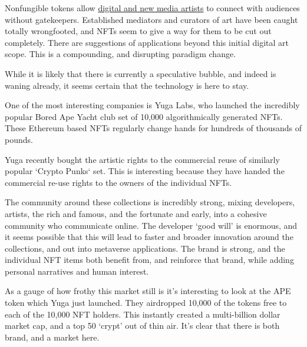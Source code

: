Nonfungible tokens allow \href{https://en.wikipedia.org/wiki/List_of_most_expensive_non-fungible_tokens}{digital and new media artists} to connect with audiences without gatekeepers. Established mediators and curators of art have been caught totally wrongfooted, and NFTs seem to give a way for them to be cut out completely. There are suggestions of applications beyond this initial digital art scope. This is a compounding, and disrupting paradigm change.\par
While it is likely that there is currently a speculative bubble, and indeed is waning already, it seems certain that the technology is here to stay.\par
One of the most interesting companies is Yuga Labs, who launched the incredibly popular Bored Ape Yacht club set of 10,000 algorithmically generated NFTs. These Ethereum based NFTs regularly change hands for hundreds of thousands of pounds.\par
Yuga recently bought the artistic rights to the commercial reuse of similarly popular `Crypto Punks` set. This is interesting because they have handed the commercial re-use rights to the owners of the individual NFTs. \par
The community around these collections is incredibly strong, mixing developers, artists, the rich and famous, and the fortunate and early, into a cohesive community who communicate online. The developer `good will' is enormous, and it seems possible that this will lead to faster and broader innovation around the collections, and out into metaverse applications. The brand is strong, and the individual NFT items both benefit from, and reinforce that brand, while adding personal narratives and human interest.\par 
As a gauge of how frothy this market still is it's interesting to look at the APE token which Yuga just launched. They airdropped 10,000 of the tokens free to each of the 10,000 NFT holders. This instantly created a multi-billion dollar market cap, and a top 50 `crypt' out of thin air. It's clear that there is both brand, and a market here.\par



